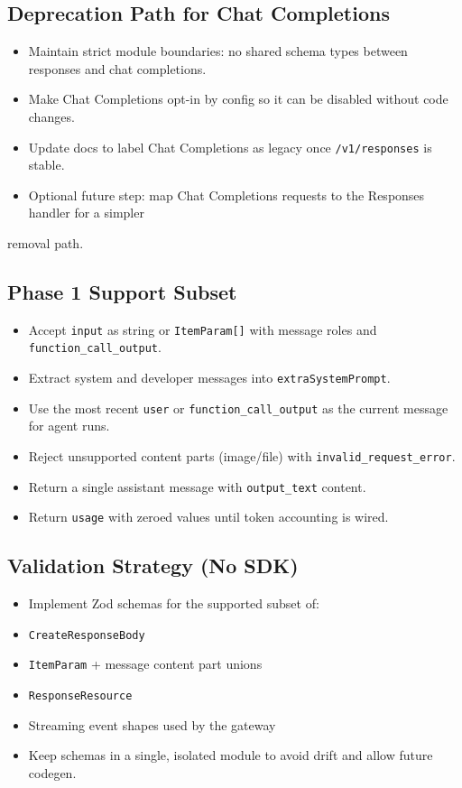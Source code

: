 \subsection{Deprecation Path for Chat Completions}


\begin{itemize}
  \item Maintain strict module boundaries: no shared schema types between responses and chat completions.
  \item Make Chat Completions opt-in by config so it can be disabled without code changes.
  \item Update docs to label Chat Completions as legacy once \texttt{/v1/responses} is stable.
  \item Optional future step: map Chat Completions requests to the Responses handler for a simpler
\end{itemize}

removal path.

\subsection{Phase 1 Support Subset}


\begin{itemize}
  \item Accept \texttt{input} as string or \texttt{ItemParam[]} with message roles and \texttt{function\_call\_output}.
  \item Extract system and developer messages into \texttt{extraSystemPrompt}.
  \item Use the most recent \texttt{user} or \texttt{function\_call\_output} as the current message for agent runs.
  \item Reject unsupported content parts (image/file) with \texttt{invalid\_request\_error}.
  \item Return a single assistant message with \texttt{output\_text} content.
  \item Return \texttt{usage} with zeroed values until token accounting is wired.
\end{itemize}


\subsection{Validation Strategy (No SDK)}


\begin{itemize}
  \item Implement Zod schemas for the supported subset of:
  \item \texttt{CreateResponseBody}
  \item \texttt{ItemParam} + message content part unions
  \item \texttt{ResponseResource}
  \item Streaming event shapes used by the gateway
  \item Keep schemas in a single, isolated module to avoid drift and allow future codegen.
\end{itemize}


